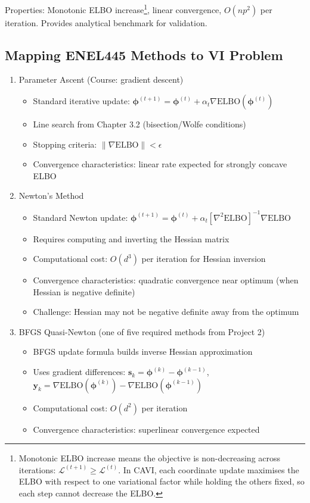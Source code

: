 \documentclass[11pt]{article}
\newcommand{\ELBO}{\text{ELBO}}
\begin{document}
Properties: Monotonic ELBO increase\footnote{Monotonic ELBO increase means the objective is non-decreasing across iterations: $\mathcal{L}^{(t+1)} \ge \mathcal{L}^{(t)}$. In CAVI, each coordinate update maximises the ELBO with respect to one variational factor while holding the others fixed, so each step cannot decrease the ELBO.}, linear convergence, $O(np^2)$ per iteration. Provides analytical benchmark for validation.

\newpage 

\subsection*{Mapping ENEL445 Methods to VI Problem}

\begin{enumerate}[leftmargin=*]
\item Parameter Ascent (Course: gradient descent)
\begin{itemize}
\item Standard iterative update: $\bm{\phi}^{(t+1)} = \bm{\phi}^{(t)} + \alpha_t \nabla \ELBO(\bm{\phi}^{(t)})$
\item Line search from Chapter 3.2 (bisection/Wolfe conditions)
\item Stopping criteria: $\|\nabla \ELBO\| < \epsilon$
\item Convergence characteristics: linear rate expected for strongly concave ELBO
\end{itemize}

\item Newton's Method   
\begin{itemize}
\item Standard Newton update: $\bm{\phi}^{(t+1)} = \bm{\phi}^{(t)} + \alpha_t [\nabla^2 \ELBO]^{-1} \nabla \ELBO$
\item Requires computing and inverting the Hessian matrix
\item Computational cost: $O(d^3)$ per iteration for Hessian inversion
\item Convergence characteristics: quadratic convergence near optimum (when Hessian is negative definite)
\item Challenge: Hessian may not be negative definite away from the optimum
\end{itemize}

\item BFGS Quasi-Newton (one of five required methods from Project 2)
\begin{itemize}
\item BFGS update formula builds inverse Hessian approximation
\item Uses gradient differences: $\bm{s}_k = \bm{\phi}^{(k)} - \bm{\phi}^{(k-1)}$, $\bm{y}_k = \nabla \ELBO(\bm{\phi}^{(k)}) - \nabla \ELBO(\bm{\phi}^{(k-1)})$ 
\item Computational cost: $O(d^2)$ per iteration
\item Convergence characteristics: superlinear convergence expected
\end{itemize}
\end{enumerate}
\end{document}
